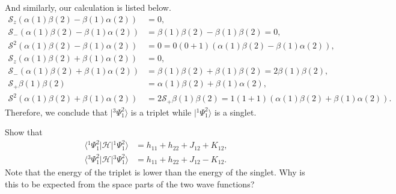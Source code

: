 \documentclass[a4paper]{book}
\newcounter{exercise}[chapter]
\newcounter{solution}[chapter]
\begin{document}
\begin{solution}
	And similarly, our calculation is listed below.
	\begin{align*}
		\mathscr{S}_z ( \alpha(1) \beta(2) - \beta(1) \alpha(2) ) &= 0 , \\
		\mathscr{S}_- ( \alpha(1) \beta(2) - \beta(1) \alpha(2) ) &= \beta(1) \beta(2) - \beta(1) \beta(2) = 0 , \\
		\mathscr{S}^2 ( \alpha(1) \beta(2) - \beta(1) \alpha(2) ) &= 0 = 0(0+1) ( \alpha(1) \beta(2) - \beta(1) \alpha(2) ), \\
		\mathscr{S}_z ( \alpha(1) \beta(2) + \beta(1) \alpha(2) ) &= 0 , \\
		\mathscr{S}_- ( \alpha(1) \beta(2) + \beta(1) \alpha(2) ) &= \beta(1) \beta(2) + \beta(1) \beta(2) = 2 \beta(1) \beta(2) , \\
		\mathscr{S}_+ \beta(1) \beta(2) &= \alpha(1) \beta(2) + \beta(1) \alpha(2) , \\
		\mathscr{S}^2 ( \alpha(1) \beta(2) + \beta(1) \alpha(2) ) &= 2 \mathscr{S}_+ \beta(1) \beta(2) = 1(1+1)(\alpha(1) \beta(2) + \beta(1) \alpha(2) ) .
	\end{align*}
	Therefore, we conclude that $|{}^3 \Psi^2_1 \rangle$ is a triplet while $|{}^1 \Psi^2_1 \rangle$ is a singlet.
	
	\end{solution}
	
	\begin{exercise}
	Show that
	\begin{align*}
		\langle {}^1 \Psi^2_1 | \mathscr{H} | {}^1 \Psi^2_1 \rangle &= h_{11} + h_{22} + J_{12} + K_{12} , \\
		\langle {}^3 \Psi^2_1 | \mathscr{H} | {}^3 \Psi^2_1 \rangle &= h_{11} + h_{22} + J_{12} - K_{12} .
	\end{align*}
	Note that the energy of the triplet is lower than the energy of the singlet. Why is this to be expected from the space parts of the two wave functions?
	\end{exercise}
	
\end{document}
